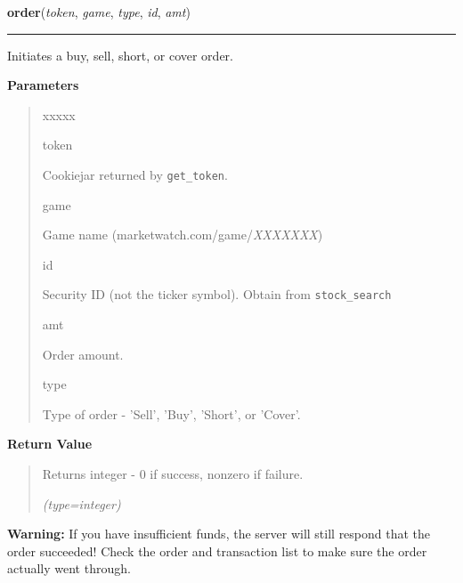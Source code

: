 \hspace{.8\funcindent}\begin{boxedminipage}{\funcwidth}

    \raggedright \textbf{order}(\textit{token}, \textit{game}, \textit{type}, \textit{id}, \textit{amt})

    \vspace{-1.5ex}

    \rule{\textwidth}{0.5\fboxrule}
\setlength{\parskip}{2ex}
    Initiates a buy, sell, short, or cover order.

\setlength{\parskip}{1ex}
      \textbf{Parameters}
      \vspace{-1ex}

      \begin{quote}
        \begin{Ventry}{xxxxx}

          \item[token]

          Cookiejar returned by \texttt{get\_token}.

          \item[game]

          Game name (marketwatch.com/game/\textit{XXXXXXX})

          \item[id]

          Security ID (not the ticker symbol). Obtain from 
          \texttt{stock\_search}

          \item[amt]

          Order amount.

          \item[type]

          Type of order - 'Sell', 'Buy', 'Short', or 'Cover'.

        \end{Ventry}

      \end{quote}

      \textbf{Return Value}
    \vspace{-1ex}

      \begin{quote}
      Returns integer - 0 if success, nonzero if failure.

      {\it (type=integer)}

      \end{quote}

\textbf{Warning:} If you have insufficient funds, the server will still respond that the 
order succeeded! Check the order and transaction list to make sure the 
order actually went through.



    \end{boxedminipage}

